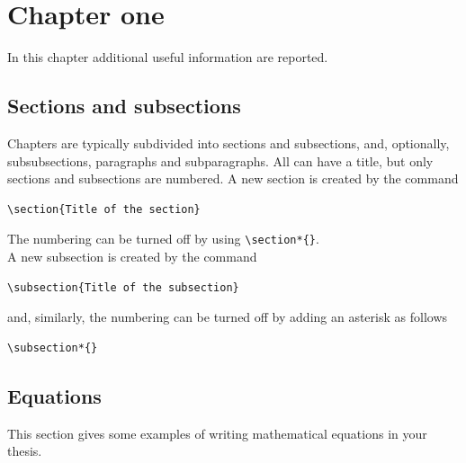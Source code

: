 \documentclass{config/PoliMi3i_thesis}
\begin{document}
\chapter{Chapter one}
\label{ch:chapter_one}%

In this chapter additional useful information are reported.

\section{Sections and subsections}
\label{sec:section_name}
Chapters are typically subdivided into sections and subsections, and, optionally,
subsubsections, paragraphs and subparagraphs.
All can have a title, but only sections and subsections are numbered.
A new section is created by the command
\begin{verbatim}
\section{Title of the section}
\end{verbatim}
The numbering can be turned off by using \verb|\section*{}|.
\\
A new subsection is created by the command
\begin{verbatim}
\subsection{Title of the subsection}
\end{verbatim}
and, similarly, the numbering can be turned off by adding an asterisk as follows
\begin{verbatim}
\subsection*{}
\end{verbatim}

\section{Equations}
\label{sec:eqs}
This section gives some examples of writing mathematical equations in your thesis.
\end{document}
